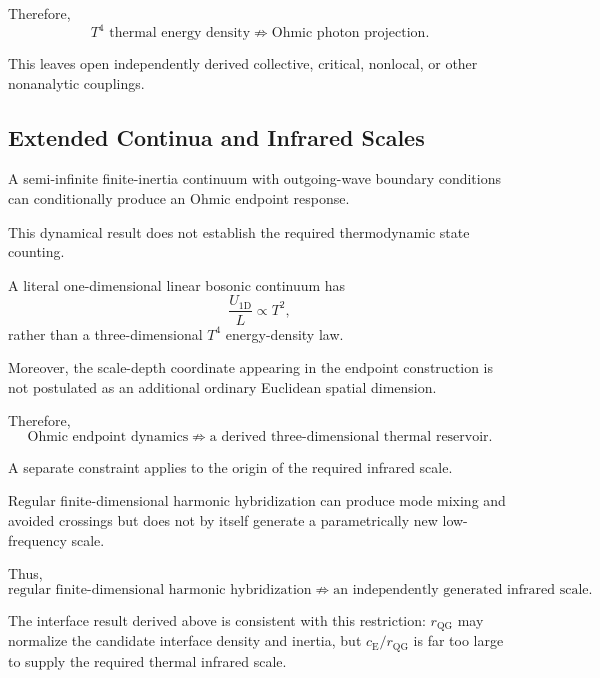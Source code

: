 Therefore,
\begin{equation}
    T^4\text{ thermal energy density}
    \not\Rightarrow
    \text{Ohmic photon projection}.
    \label{eq:AT_constraint_T4_Ohmic}
\end{equation}

This leaves open independently derived collective, critical, nonlocal, or
other nonanalytic couplings.


\subsection{Extended Continua and Infrared Scales}

A semi-infinite finite-inertia continuum with outgoing-wave boundary
conditions can conditionally produce an Ohmic endpoint response.

This dynamical result does not establish the required thermodynamic state
counting.

A literal one-dimensional linear bosonic continuum has
\begin{equation}
    \frac{U_{\mathrm{1D}}}{L}
    \propto
    T^2,
\end{equation}
rather than a three-dimensional
\(T^4\)
energy-density law.

Moreover, the scale-depth coordinate appearing in the endpoint construction
is not postulated as an additional ordinary Euclidean spatial dimension.

Therefore,
\begin{equation}
    \text{Ohmic endpoint dynamics}
    \not\Rightarrow
    \text{a derived three-dimensional thermal reservoir}.
    \label{eq:AT_constraint_extended_continuum}
\end{equation}

A separate constraint applies to the origin of the required infrared scale.

Regular finite-dimensional harmonic hybridization can produce mode mixing
and avoided crossings but does not by itself generate a parametrically new
low-frequency scale.

Thus,
\begin{equation}
    \text{regular finite-dimensional harmonic hybridization}
    \not\Rightarrow
    \text{an independently generated infrared scale}.
    \label{eq:AT_constraint_hybridization}
\end{equation}

The interface result derived above is consistent with this restriction:
\(r_{\mathrm{QG}}\)
may normalize the candidate interface density and inertia, but
\(c_{\mathrm E}/r_{\mathrm{QG}}\)
is far too large to supply the required thermal infrared scale.

